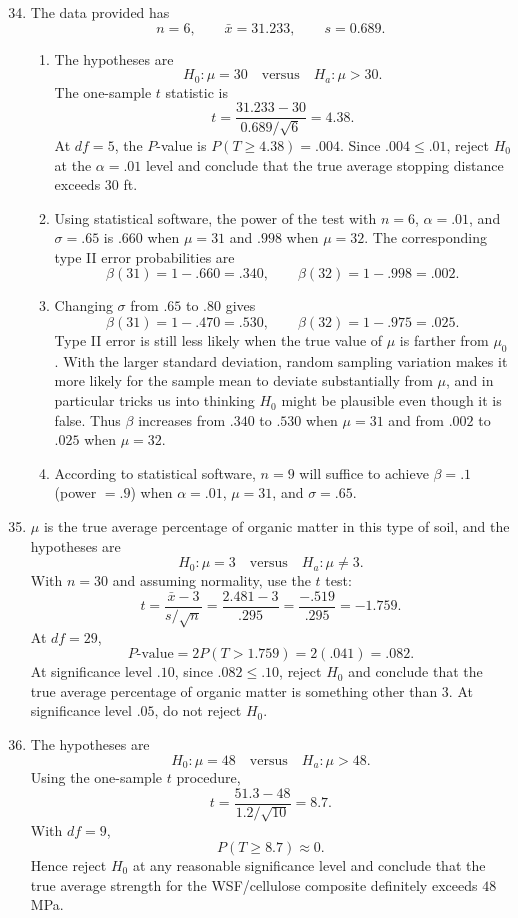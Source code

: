 \documentclass[12pt]{article}
\begin{document}
\begin{enumerate}[label=\textbf{\arabic*.}, leftmargin=*]
\setcounter{enumi}{33}
\item
The data provided has
\[
n=6,\qquad \bar{x}=31.233,\qquad s=0.689.
\]
\begin{enumerate}[label=\alph*.]
    \item The hypotheses are
    \[
    H_0:\mu=30\quad\text{versus}\quad H_a:\mu>30.
    \]
    The one-sample $t$ statistic is
    \[
    t=\frac{31.233-30}{0.689/\sqrt{6}}=4.38.
    \]
    At $df=5$, the $P$-value is $P(T\ge4.38)=.004$. Since $.004\le.01$, reject $H_0$ at the $\alpha=.01$ level and conclude that the true average stopping distance exceeds $30$ ft.

    \item Using statistical software, the power of the test with $n=6$, $\alpha=.01$, and $\sigma=.65$ is $.660$ when $\mu=31$ and $.998$ when $\mu=32$. The corresponding type II error probabilities are
    \[
    \beta(31)=1-.660=.340,
    \qquad
    \beta(32)=1-.998=.002.
    \]

    \item Changing $\sigma$ from $.65$ to $.80$ gives
    \[
    \beta(31)=1-.470=.530,
    \qquad
    \beta(32)=1-.975=.025.
    \]
    Type II error is still less likely when the true value of $\mu$ is farther from $\mu_0$. With the larger standard deviation, random sampling variation makes it more likely for the sample mean to deviate substantially from $\mu$, and in particular tricks us into thinking $H_0$ might be plausible even though it is false. Thus $\beta$ increases from $.340$ to $.530$ when $\mu=31$ and from $.002$ to $.025$ when $\mu=32$.

    \item According to statistical software, $n=9$ will suffice to achieve $\beta=.1$ (power $=.9$) when $\alpha=.01$, $\mu=31$, and $\sigma=.65$.
\end{enumerate}

\setcounter{enumi}{37}
\item
$\mu$ is the true average percentage of organic matter in this type of soil, and the hypotheses are
\[
H_0:\mu=3\quad\text{versus}\quad H_a:\mu\ne3.
\]
With $n=30$ and assuming normality, use the $t$ test:
\[
t=\frac{\bar{x}-3}{s/\sqrt{n}}
=\frac{2.481-3}{.295}=
\frac{-.519}{.295}=-1.759.
\]
At $df=29$,
\[
P\text{-value}=2P(T>1.759)=2(.041)=.082.
\]
At significance level $.10$, since $.082\le.10$, reject $H_0$ and conclude that the true average percentage of organic matter is something other than $3$. At significance level $.05$, do not reject $H_0$.

\setcounter{enumi}{39}
\item
The hypotheses are
\[
H_0:\mu=48\quad\text{versus}\quad H_a:\mu>48.
\]
Using the one-sample $t$ procedure,
\[
t=\frac{51.3-48}{1.2/\sqrt{10}}=8.7.
\]
With $df=9$,
\[
P(T\ge8.7)\approx0.
\]
Hence reject $H_0$ at any reasonable significance level and conclude that the true average strength for the WSF/cellulose composite definitely exceeds $48$ MPa.

\end{enumerate}
\end{document}
